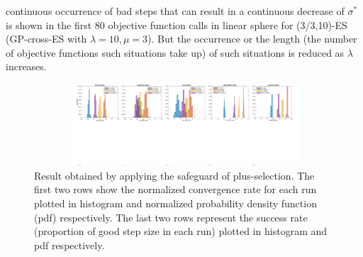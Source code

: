 continuous occurrence of bad steps that can result in a continuous decrease of $\sigma^*$ is shown in the first 80 objective function calls in linear sphere for (3/3,10)-ES (GP-cross-ES with $\lambda=10,\mu=3$). But the occurrence or the length (the number of objective functions such situations take up) of such situations is reduced as $\lambda$ increases.


\begin{center}
\begin{figure}
\includegraphics[height=1.2in, width=6in]{success_emergency_v3_final.pdf}
\caption{Result obtained by applying the safeguard of plus-selection. The first two rows show the normalized convergence rate for each run plotted in histogram and normalized probability density function (pdf) respectively. The last two rows represent the success rate (proportion of good step size in each run) plotted in histogram and pdf respectively. 
}
\label{fig:success_plot_GP-cross-ES}
\end{figure}
\end{center}





